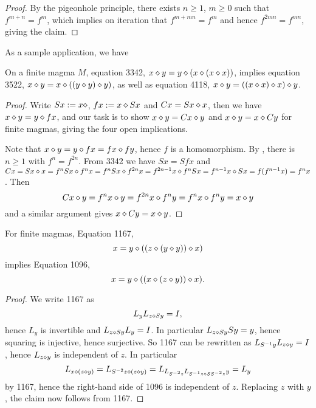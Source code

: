 \begin{proof} \leanok By the pigeonhole principle, there exists $n \geq 1$, $m \geq 0$ such that $f^{m+n} = f^m$, which implies on iteration that $f^{m+mn} = f^m$ and hence $f^{2mn} = f^{mn}$, giving the claim.
\end{proof}

As a sample application, we have

\begin{corollary}[3342]\label{3342}  \leanok  On a finite magma $M$, equation 3342, $x \diamond y= y \diamond (x \diamond (x \diamond x))$, implies
  equation 3522, $x \diamond y = x \diamond ((y \diamond y) \diamond y)$, as well as equation 4118, $x \diamond y = ((x \diamond x) \diamond x) \diamond y$.
\end{corollary}

\begin{proof} \leanok Write $Sx := x \diamond$, $fx := x \diamond Sx$ and $Cx = Sx \diamond x$, then we have $x \diamond y= y \diamond fx$, and our task is to show $x \diamond y = Cx \diamond y$ and $x \diamond y = x \diamond Cy$ for finite magmas, giving the four open implications.

Note that $x \diamond y= y \diamond fx = fx \diamond fy$, hence $f$ is a homomorphism.  By , there is $n \geq 1$ with $f^n = f^{2n}$.  From 3342 we have $Sx = S fx$ and $Cx = Sx \diamond x = f^n Sx \diamond f^n x = f^n Sx \diamond f^{2n} x = f^{2n-1} x \diamond f^n Sx = f^{n-1} x \diamond S x = f(f^{n-1} x) = f^n x$.  Then
$$ Cx \diamond y = f^n x \diamond y = f^{2n} x \diamond f^n y = f^n x \diamond f^n y = x \diamond y$$
and a similar argument gives $x \diamond Cy = x \diamond y$.
\end{proof}

\begin{proposition}[1167 implies 1096]\label{1167-1096}\leanok{}
  For finite magmas, Equation 1167,
  $$ x = y \diamond ((z \diamond (y \diamond y)) \diamond x)$$
implies Equation 1096,
$$ x = y \diamond ((x \diamond (z \diamond y)) \diamond x).$$
\end{proposition}

\begin{proof}\leanok We write 1167 as
  $$ L_y L_{z \diamond Sy} = I,$$
hence $L_y$ is invertible and $L_{z \diamond Sy} L_y = I$.  In particular $L_{z \diamond Sy} Sy = y$, hence squaring is injective, hence surjective.  So 1167 can be rewritten as $L_{S^{-1} y} L_{z \diamond y} = I$, hence $L_{z \diamond y}$ is independent of $z$.  In particular
$$ L_{x \diamond (z \diamond y)} = L_{S^{-2} z \diamond (z \diamond y)} = L_{L_{S^{-2} z} L_{S^{-1} z \diamond S S^{-2} z} y} = L_y$$
by 1167, hence the right-hand side of 1096 is independent of $z$.  Replacing $z$ with $y$, the claim now follows from 1167.
\end{proof}


